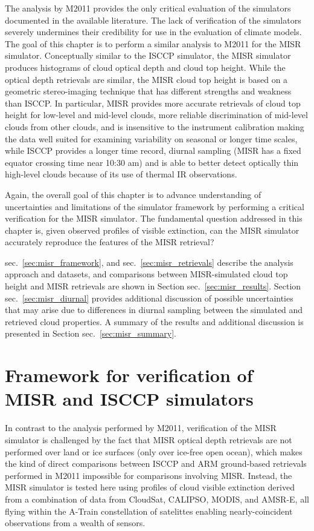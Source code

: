 The analysis by M2011 provides the only critical evaluation of the
simulators documented in the available literature. The lack of
verification of the simulators severely undermines their credibility for
use in the evaluation of climate models. The goal of this chapter is to
perform a similar analysis to M2011 for the MISR simulator. Conceptually
similar to the ISCCP simulator, the MISR simulator produces histograms
of cloud optical depth and cloud top height. While the optical depth
retrievals are similar, the MISR cloud top height is based on a
geometric stereo-imaging technique that has different strengths and
weakness than ISCCP. In particular, MISR provides more accurate
retrievals of cloud top height for low-level and mid-level clouds, more
reliable discrimination of mid-level clouds from other clouds, and is
insensitive to the instrument calibration making the data well suited
for examining variability on seasonal or longer time scales, while ISCCP
provides a longer time record, diurnal sampling (MISR has a fixed
equator crossing time near 10:30 am) and is able to better detect
optically thin high-level clouds because of its use of thermal IR
observations.

Again, the overall goal of this chapter is to advance understanding of
uncertainties and limitations of the simulator framework by performing a
critical verification for the MISR simulator. The fundamental question
addressed in this chapter is, given observed profiles of visible
extinction, can the MISR simulator accurately reproduce the features of
the MISR retrieval?

sec.~\ref{sec:misr_framework}, and sec.~\ref{sec:misr_retrievals}
describe the analysis approach and datasets, and comparisons between
MISR-simulated cloud top height and MISR retrievals are shown in Section
sec.~\ref{sec:misr_results}. Section sec.~\ref{sec:misr_diurnal}
provides additional discussion of possible uncertainties that may arise
due to differences in diurnal sampling between the simulated and
retrieved cloud properties. A summary of the results and additional
discussion is presented in Section sec.~\ref{sec:misr_summary}.

\section{Framework for verification of MISR and ISCCP
simulators}\label{sec:misrux5fframework}

In contrast to the analysis performed by M2011, verification of the MISR
simulator is challenged by the fact that MISR optical depth retrievals
are not performed over land or ice surfaces (only over ice-free open
ocean), which makes the kind of direct comparisons between ISCCP and ARM
ground-based retrievals performed in M2011 impossible for comparisons
involving MISR. Instead, the MISR simulator is tested here using
profiles of cloud visible extinction derived from a combination of data
from CloudSat, CALIPSO, MODIS, and AMSR-E, all flying within the A-Train
constellation of satelittes enabling nearly-coincident observations from
a wealth of sensors.

